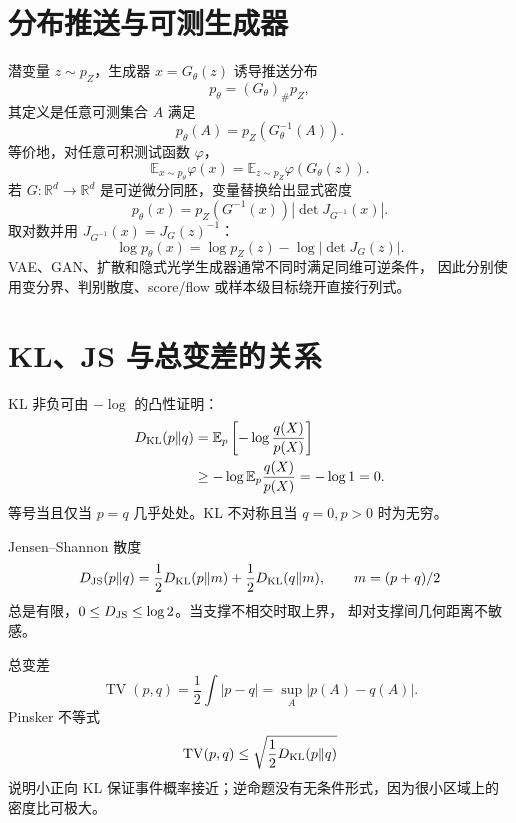 \documentclass[11pt]{article}
\numberwithin{equation}{section}
\newcommand{\R}{\mathbb{R}}
\newcommand{\E}{\mathbb{E}}
\newcommand{\1}{\mathbf{1}}
\begin{document}
\section{分布推送与可测生成器}

潜变量 $z\sim p_Z$，生成器 $x=G_\theta(z)$ 诱导推送分布
\begin{equation}
 p_\theta=(G_\theta)_\#p_Z,
\end{equation}
其定义是任意可测集合 $A$ 满足
\begin{equation}
 p_\theta(A)=p_Z(G_\theta^{-1}(A)).
\end{equation}
等价地，对任意可积测试函数 $\varphi$，
\begin{equation}
 \E_{x\sim p_\theta}\varphi(x)
 =\E_{z\sim p_Z}\varphi(G_\theta(z)).
\end{equation}
若 $G:\R^d\to\R^d$ 是可逆微分同胚，变量替换给出显式密度
\begin{equation}
 p_\theta(x)=p_Z(G^{-1}(x))
 \left|\det J_{G^{-1}}(x)\right|.
\end{equation}
取对数并用 $J_{G^{-1}}(x)=J_G(z)^{-1}$：
\begin{equation}
 \log p_\theta(x)=\log p_Z(z)-\log|\det J_G(z)|.
\end{equation}
VAE、GAN、扩散和隐式光学生成器通常不同时满足同维可逆条件，
因此分别使用变分界、判别散度、score/flow 或样本级目标绕开直接行列式。

\section{KL、JS 与总变差的关系}

KL 非负可由 $-\log$ 的凸性证明：
\begin{align}
 D_{\rm KL}(p\|q)
 &=\E_p\left[-\log\frac{q(X)}{p(X)}\right]\\
 &\ge-\log\E_p\frac{q(X)}{p(X)}=-\log1=0.
\end{align}
等号当且仅当 $p=q$ 几乎处处。KL 不对称且当 $q=0,p>0$ 时为无穷。

Jensen--Shannon 散度
\begin{equation}
 D_{\rm JS}(p\|q)=\frac12D_{\rm KL}(p\|m)
 +\frac12D_{\rm KL}(q\|m),\qquad m=(p+q)/2
\end{equation}
总是有限，$0\le D_{\rm JS}\le\log2$。当支撑不相交时取上界，
却对支撑间几何距离不敏感。

总变差
\begin{equation}
 \operatorname{TV}(p,q)=\frac12\int|p-q|
 =\sup_A|p(A)-q(A)|.
\end{equation}
Pinsker 不等式
\begin{equation}
 \operatorname{TV}(p,q)
 \le\sqrt{\frac12D_{\rm KL}(p\|q)}
\end{equation}
说明小正向 KL 保证事件概率接近；逆命题没有无条件形式，因为很小区域上的密度比可极大。
\end{document}

